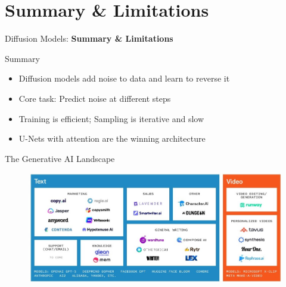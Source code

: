 \section{Summary \& Limitations}
\begin{frame}{}
    \LARGE Diffusion Models: \textbf{Summary \& Limitations}
\end{frame}

\begin{frame}{Summary}
    \begin{itemize}
        \item Diffusion models add noise to data and learn to reverse it
        \item Core task: Predict noise at different steps
        \item Training is efficient; Sampling is iterative and slow
        \item U-Nets with attention are the winning architecture
    \end{itemize}
\end{frame}


\begin{frame}{The Generative AI Landscape}
\begin{figure}
    \centering
    \includegraphics[height=0.9\textheight, width=1.05\textwidth, keepaspectratio]{images/diffusion/gen_ai_landscape.jpg}
\end{figure}
\end{frame}

